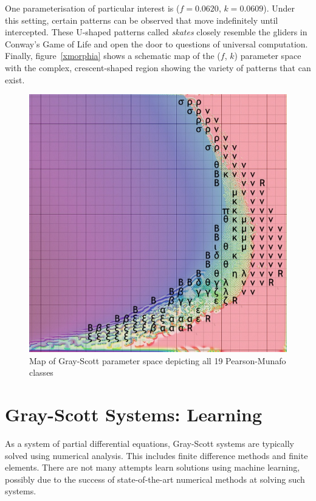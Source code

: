 One parameterisation of particular interest is ($f=0.0620$, $k=0.0609$). Under this setting, certain patterns can be observed that move indefinitely until intercepted. These U-shaped patterns called \textit{skates} closely resemble the gliders in Conway's Game of Life and open the door to questions of universal computation. Finally, figure~\ref{xmorphia} shows a schematic map of the ($f$, $k$) parameter space with the complex, crescent-shaped region showing the variety of patterns that can exist.\\

\begin{figure}[!h]
\centering
\includegraphics[width=.9\textwidth]{images/munafo/xmorphia.jpg}
\caption{Map of Gray-Scott parameter space depicting all 19 Pearson-Munafo classes \cite{xmorphia}}
\label{fig:xmorphia}
\end{figure}

\section{Gray-Scott Systems: Learning}

As a system of partial differential equations, Gray-Scott systems are typically solved using numerical analysis. This includes finite difference methods\cite{manaa2013successive} and finite elements\cite{yadav2019finite}. There are not many attempts learn solutions using machine learning, possibly due to the success of state-of-the-art numerical methods at solving such systems.\\

